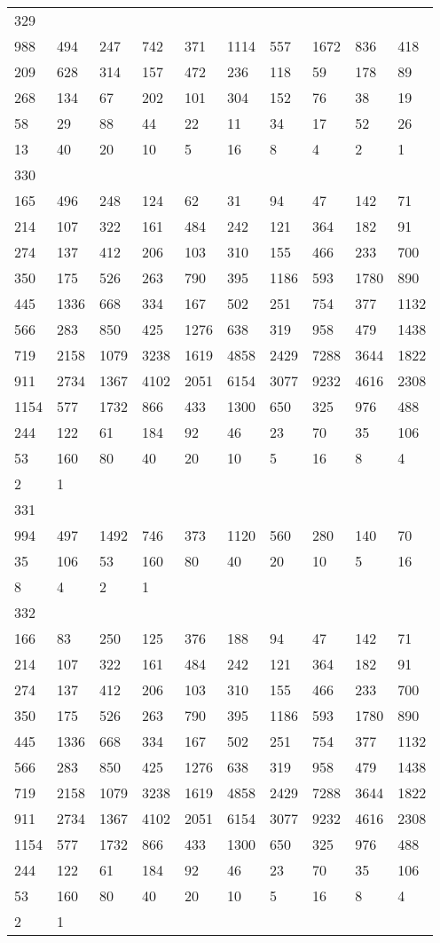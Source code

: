 \begin{longtable}{*{10}{l}}
329&&&&&&&&&\\
988& 494& 247& 742& 371& 1114& 557& 1672& 836& 418\\
209& 628& 314& 157& 472& 236& 118& 59& 178& 89\\
268& 134& 67& 202& 101& 304& 152& 76& 38& 19\\
58& 29& 88& 44& 22& 11& 34& 17& 52& 26\\
13& 40& 20& 10& 5& 16& 8& 4& 2& 1\\

330&&&&&&&&&\\
165& 496& 248& 124& 62& 31& 94& 47& 142& 71\\
214& 107& 322& 161& 484& 242& 121& 364& 182& 91\\
274& 137& 412& 206& 103& 310& 155& 466& 233& 700\\
350& 175& 526& 263& 790& 395& 1186& 593& 1780& 890\\
445& 1336& 668& 334& 167& 502& 251& 754& 377& 1132\\
566& 283& 850& 425& 1276& 638& 319& 958& 479& 1438\\
719& 2158& 1079& 3238& 1619& 4858& 2429& 7288& 3644& 1822\\
911& 2734& 1367& 4102& 2051& 6154& 3077& 9232& 4616& 2308\\
1154& 577& 1732& 866& 433& 1300& 650& 325& 976& 488\\
244& 122& 61& 184& 92& 46& 23& 70& 35& 106\\
53& 160& 80& 40& 20& 10& 5& 16& 8& 4\\
2& 1& \\

331&&&&&&&&&\\
994& 497& 1492& 746& 373& 1120& 560& 280& 140& 70\\
35& 106& 53& 160& 80& 40& 20& 10& 5& 16\\
8& 4& 2& 1& \\

332&&&&&&&&&\\
166& 83& 250& 125& 376& 188& 94& 47& 142& 71\\
214& 107& 322& 161& 484& 242& 121& 364& 182& 91\\
274& 137& 412& 206& 103& 310& 155& 466& 233& 700\\
350& 175& 526& 263& 790& 395& 1186& 593& 1780& 890\\
445& 1336& 668& 334& 167& 502& 251& 754& 377& 1132\\
566& 283& 850& 425& 1276& 638& 319& 958& 479& 1438\\
719& 2158& 1079& 3238& 1619& 4858& 2429& 7288& 3644& 1822\\
911& 2734& 1367& 4102& 2051& 6154& 3077& 9232& 4616& 2308\\
1154& 577& 1732& 866& 433& 1300& 650& 325& 976& 488\\
244& 122& 61& 184& 92& 46& 23& 70& 35& 106\\
53& 160& 80& 40& 20& 10& 5& 16& 8& 4\\
2& 1& \\


\end{longtable}
